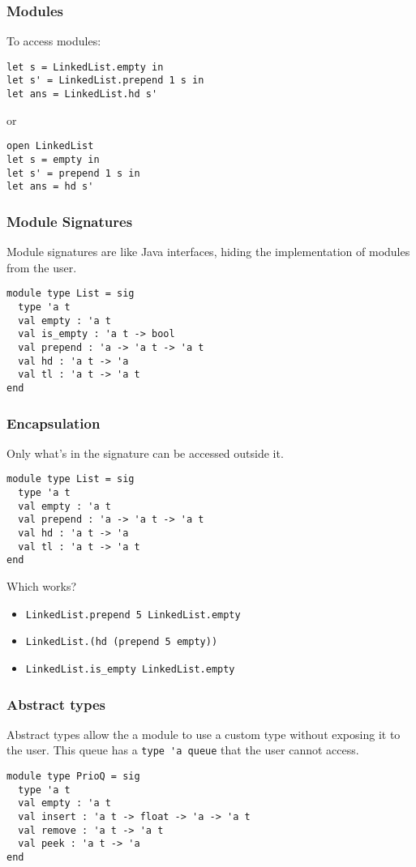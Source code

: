\documentclass{beamer}
\newcommand{\redx}{{\color{red} \ding{55}}}
\newcommand{\greencheck}{{\color{green} \ding{51}}}
\begin{document}
\begin{frame}[fragile]
\frametitle{Modules}
To access modules:
\begin{lstlisting}
let s = LinkedList.empty in
let s' = LinkedList.prepend 1 s in
let ans = LinkedList.hd s'
\end{lstlisting}
or
\begin{lstlisting}
open LinkedList
let s = empty in
let s' = prepend 1 s in
let ans = hd s'
\end{lstlisting}
\end{frame}

\begin{frame}[fragile]
\frametitle{Module Signatures}
Module signatures are like Java interfaces, hiding the implementation of modules from the user.
\begin{lstlisting}
module type List = sig
  type 'a t
  val empty : 'a t
  val is_empty : 'a t -> bool
  val prepend : 'a -> 'a t -> 'a t
  val hd : 'a t -> 'a
  val tl : 'a t -> 'a t
end
\end{lstlisting}
\end{frame}

\begin{frame}[fragile]
\frametitle{Encapsulation}
Only what's in the signature can be accessed outside it.
\begin{lstlisting}
module type List = sig
  type 'a t
  val empty : 'a t
  val prepend : 'a -> 'a t -> 'a t
  val hd : 'a t -> 'a
  val tl : 'a t -> 'a t
end
\end{lstlisting}

Which works? \pause
\begin{itemize}
\item \verb|LinkedList.prepend 5 LinkedList.empty| \pause \greencheck \pause
\item \verb|LinkedList.(hd (prepend 5 empty))| \pause \greencheck \pause
\item \verb|LinkedList.is_empty LinkedList.empty| \pause \redx
\end{itemize}
\end{frame}

\begin{frame}[fragile]
\frametitle{Abstract types}
Abstract types allow the a module to use a custom type without exposing it to the user. This queue has a \verb|type 'a queue| that the user cannot access.
\begin{lstlisting}
module type PrioQ = sig
  type 'a t
  val empty : 'a t
  val insert : 'a t -> float -> 'a -> 'a t
  val remove : 'a t -> 'a t
  val peek : 'a t -> 'a
end
\end{lstlisting}
\end{frame}
\end{document}
